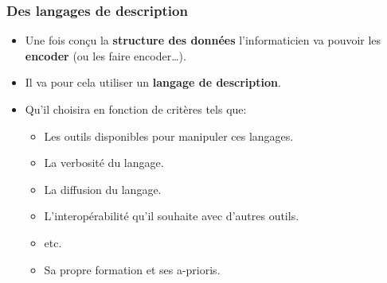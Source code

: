 \subsubsection{Des langages de description}

\begin{slide}
	\begin{itemize}
		\item Une fois conçu la \textbf{structure des données} l'informaticien va pouvoir les \textbf{encoder} (ou les faire encoder…).
		\item Il va pour cela utiliser un \textbf{langage de description}.
		\item Qu'il choisira en fonction de critères tels que:
			\begin{itemize}
				\item Les outils disponibles pour manipuler ces langages.
				\item La verbosité du langage.
				\item La diffusion du langage.
				\item L'interopérabilité qu'il souhaite avec d'autres outils.
				\item etc.
				\item Sa propre formation et ses a-prioris.
			\end{itemize}
	\end{itemize}
\end{slide}

\begin{slide}

		\beamerdefaultoverlayspecification{}

		
	
		
\end{slide}

